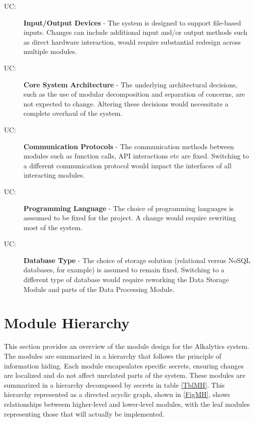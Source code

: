\documentclass[12pt, titlepage]{article}
\newcounter{ucnum}
\newcommand{\uctheucnum}{UC\theucnum}
\begin{document}
\begin{description}
  \item[ \uctheucnum \label{ucIO}:] \textbf{Input/Output Devices} - 
  The system is designed to support file-based inputs. Changes can include additional input
  and/or output methods such as direct hardware interaction, would require substantial
  redesign across multiple modules.
  
  \item[ \uctheucnum \label{ucSysArch}:] \textbf{Core System Architecture} -
  The underlying architectural decisions, such as the use of modular decomposition and separation
  of concerns, are not expected to change. Altering these decisions would necessitate a complete overhaul
  of the system.
  
  \item[ \uctheucnum \label{ucComms}:] \textbf{Communication Protocols} -
  The communication methods between modules such as function calls, API interactions etc are fixed. 
  Switching to a different communication protocol would impact the interfaces of all interacting modules.

  \item[ \uctheucnum \label{ucLanguage}:] \textbf{Programming Language} -
  The choice of programming languages is asssumed to be fixed for the project. A change would
  require rewriting most of the system.

  \item[ \uctheucnum \label{ucDatabase}:] \textbf{Database Type} -
  The choice of storage solution (relational versus NoSQL databases, for example) is assumed to remain
  fixed. Switching to a different type of database would require reworking the Data Storage
  Module and parts of the Data Processing Module.

\end{description}

\section{Module Hierarchy} \label{SecMH}

This section provides an overview of the module design for the Alkalytics system.
The modules are summarized in a hierarchy that follows the principle of information
hiding. Each module encapsulates specific secrets, ensuring changes are localized
and do not affect unrelated parts of the system. These modules are summarized in
a hierarchy decomposed by secrets in table \ref{TblMH}. This hierarchy represented
as a directed acyclic graph, shown in \ref{FigMH}, shows relationships betweem
higher-level and lower-level modules, with the leaf modules representing those that
will actually be implemented.
\end{document}
